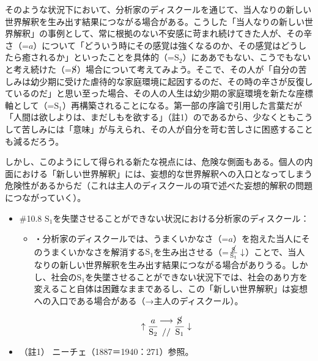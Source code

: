 そのような状況下において、分析家のディスクールを通じて、当人なりの新しい世界解釈を生み出す結果につながる場合がある。こうした「当人なりの新しい世界解釈」の事例として、常に根拠のない不安感に苛まれ続けてきた人が、その辛さ（=\(a\)）について「どういう時にその感覚は強くなるのか、その感覚はどうしたら癒されるか」といったことを具体的（=\(\textrm{S}_2\)）にああでもない、こうでもないと考え続けた（=\(\cancel{\textrm{S}}\)）場合について考えてみよう。そこで、その人が「自分の苦しみは幼少期に受けた虐待的な家庭環境に起因するのだ、その時の辛さが反復しているのだ」と思い至った場合、その人の人生は幼少期の家庭環境を新たな座標軸として（=\(\textrm{S}_1\)）再構築されることになる。第一部の序論で引用した言葉だが「人間は欲しよりは、まだしもを欲する」（註1）のであるから、少なくともこうして苦しみには「意味」が与えられ、その人が自分を苛む苦しさに困惑することも減るだろう。

しかし、このようにして得られる新たな視点には、危険な側面もある。個人の内面における「新しい世界解釈」には、妄想的な世界解釈への入口となってしまう危険性があるからだ（これは主人のディスクールの項で述べた妄想的解釈の問題につながっていく）。

\begin{note}{}
  \begin{itemize}
    \tightlist
    \item{\#10.8} $\textrm{S}_1$を失墜させることができない状況における分析家のディスクール：
      \begin{itemize}
        \tightlist
        \item ・分析家のディスクールでは、うまくいかなさ（=$a$）を抱えた当人にそのうまくいかなさを解消する$\textrm{S}_1$を生み出させる（=$\frac{\cancel{\textrm{S}}}{\textrm{S}_1}\downarrow$）ことで、当人なりの新しい世界解釈を生み出す結果につながる場合がありうる。しかし、社会の$\textrm{S}_1$を失墜させることができない状況下では、社会のあり方を変えること自体は困難なままであるし、この「新しい世界解釈」は妄想への入口である場合がある（→主人のディスクール）。
      \end{itemize}

$$
\uparrow\frac{a}{\mathrm{S_2}}\genfrac{}{}{0pt}{}{\longrightarrow}{//}\frac{\cancel{\textrm{S}}}{\mathrm{S_1}}\downarrow
$$
  \end{itemize}
\end{note}

\begin{itemize}
\tightlist
\item
  （註1） ニーチェ（1887＝1940：271）\cite{Nietzsche2}参照。
\end{itemize}

